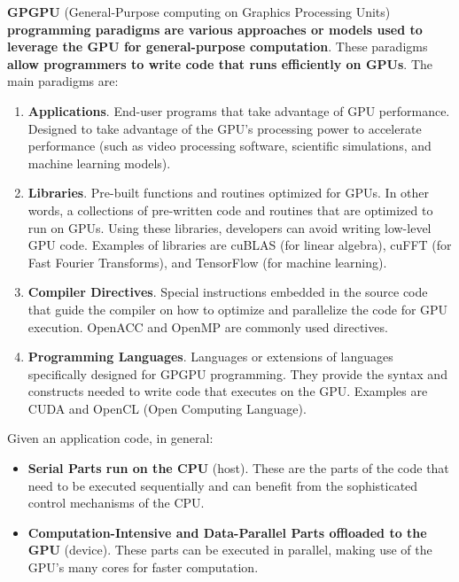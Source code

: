 \noindent
\textbf{GPGPU} (General-Purpose computing on Graphics Processing Units) \textbf{programming paradigms are various approaches or models used to leverage the GPU for general-purpose computation}. These paradigms \textbf{allow programmers to write code that runs efficiently on GPUs}. The main paradigms are:
\begin{enumerate}
    \item \textbf{Applications}. End-user programs that take advantage of GPU performance. Designed to take advantage of the GPU's processing power to accelerate performance (such as video processing software, scientific simulations, and machine learning models).

    \item \textbf{Libraries}. Pre-built functions and routines optimized for GPUs. In other words, a collections of pre-written code and routines that are optimized to run on GPUs. Using these libraries, developers can avoid writing low-level GPU code. Examples of libraries are cuBLAS (for linear algebra), cuFFT (for Fast Fourier Transforms), and TensorFlow (for machine learning).

    \item \textbf{Compiler Directives}. Special instructions embedded in the source code that guide the compiler on how to optimize and parallelize the code for GPU execution. OpenACC and OpenMP are commonly used directives.
 
    \item \textbf{Programming Languages}. Languages or extensions of languages specifically designed for GPGPU programming. They provide the syntax and constructs needed to write code that executes on the GPU. Examples are CUDA and OpenCL (Open Computing Language).
\end{enumerate}

\highspace
Given an application code, in general:
\begin{itemize}
    \item \textbf{Serial Parts run on the CPU} (host). These are the parts of the code that need to be executed sequentially and can benefit from the sophisticated control mechanisms of the CPU.

    \item \textbf{Computation-Intensive and Data-Parallel Parts offloaded to the GPU} (device). These parts can be executed in parallel, making use of the GPU's many cores for faster computation.
\end{itemize}


